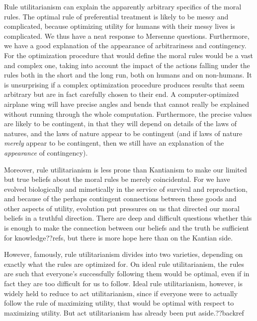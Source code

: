 Rule utilitarianism can explain the apparently arbitrary specifics of the moral rules. The optimal rule of preferential
treatment is likely to be messy and complicated, because optimizing utility for humans with their messy lives is
complicated. We thus have a neat response to Mersenne questions. Furthermore, we have a good explanation of the
appearance of arbitrariness and contingency. For the optimization procedure that would define the moral rules would be a vast
and complex one, taking into account the impact of the actions falling under the rules both in the short and the long run, 
both on humans and on non-humans. It is unsurprising if a complex optimization procedure produces results that seem
arbitrary but are in fact carefully chosen to their end. A computer-optimized airplane wing will have precise angles and
bends that cannot really be explained without running through the whole computation. Furthermore, the precise values
are likely to be contingent, in that they will depend on details of the laws of natures, and the laws of nature appear
to be contingent (and if laws of nature \textit{merely} appear to be contingent, then we still have an explanation of 
the \textit{appearance} of contingency).

Moreover, rule utilitarianism is less prone than Kantianism to make our limited but true beliefs about the moral rules be 
merely coincidental. For we have evolved biologically and mimetically in the service of survival and reproduction, and 
because of the perhaps contingent connections between these goods and other aspects of utility, evolution put pressures on us 
that directed our moral beliefs in a truthful direction. There are deep and difficult questions whether this is enough
to make the connection between our beliefs and the truth be sufficient for knowledge??refs, but there is more hope here
than on the Kantian side.

However, famously, rule utilitarianism divides into two varieties, depending on exactly what the rules are optimized for.
On ideal rule utilitarianism, the rules are such that everyone's successfully following them would be optimal, even if in
fact they are too difficult for us to follow. Ideal rule utilitarianism, however, is widely held to reduce to act
utilitarianism, since if everyone were to actually follow the rule of maximizing utility, that would be optimal
with respect to maximizing utility. But act utilitarianism has already been put aside.??backref

